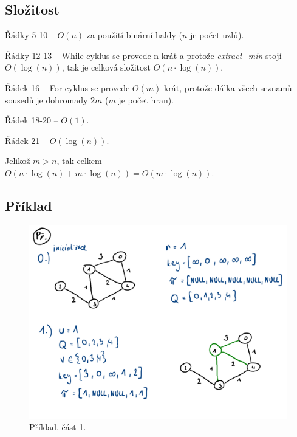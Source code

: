 \subsection*{Složitost}

\begin{compactitem}
    \item Řádky 5-10 -- $O(n)$ za použití binární haldy ($n$ je počet uzlů).
    \item Řádky 12-13 -- While cyklus se provede n-krát a protože \textit{extract\_min} stojí $O(\log(n))$, tak je celková složitost $O(n \cdot \log(n))$.
    \item Řádek 16 -- For cyklus se provede $O(m)$ krát, protože dálka všech seznamů sousedů je dohromady $2m$ ($m$ je počet hran).
    \item Řádek 18-20 -- $O(1)$.
    \item Řádek 21 -- $O(\log(n))$.
    \item Jelikož $m > n$, tak celkem $O(n \cdot \log(n) + m \cdot \log(n)) = O(m \cdot \log(n))$.
\end{compactitem}

\subsection*{Příklad}

\begin{figure}[H]
    \centering
    \includegraphics[width=0.9\linewidth]{03-minimalni-kostry-16.pdf}
    \caption{Příklad, část 1.}
\end{figure}

